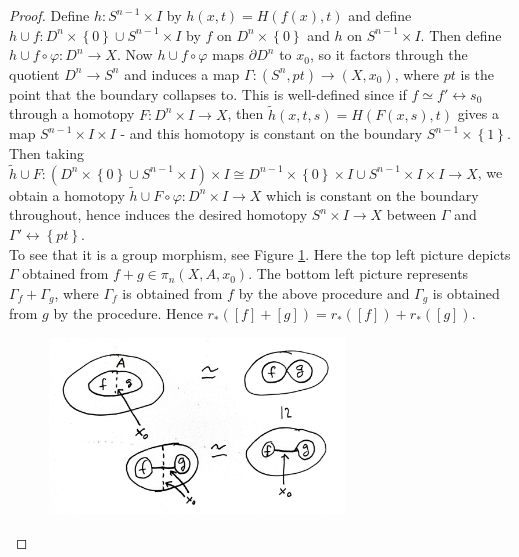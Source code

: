 \begin{proof}
        Define
        $h \colon S^{n-1} \times I$ by
        $h(x,t ) = H\left( f(x), t \right) $ and
        define $h \cup f \colon
        D^{n} \times \left\{ 0 \right\} \cup 
        S^{n-1} \times I$ by
        $f$ on $D^{n} \times \left\{ 0 \right\} $ and
        $h$ on $S^{n-1} \times I$. Then define
        $h \cup f \circ \varphi \colon
        D^{n} \to X$.
        Now $h \cup f \circ \varphi $ maps
        $\partial D^{n}$ to
        $x_0$, so
        it factors through the quotient
        $D^{n} \to S^{n}$ and induces
        a map
        $ \Gamma
        \colon \left( S^{n}, pt \right) 
        \to \left( X,x_0 \right) $, where
        $pt$ is the point that the boundary collapses to.
        This is well-defined since if
        $f \simeq f' \rel s_0$ through 
        a homotopy $F \colon D^{n} \times I \to X$, then
        $\tilde{h}(x,t,s) = 
        H\left( F(x,s), t \right) $ gives a map
        $S^{n-1} \times I \times I$ - and
        this homotopy is constant on the
        boundary $S^{n-1} \times \left\{ 1 \right\} $.
        Then taking
        $\tilde{h} \cup  F \colon
        \left( D^{n} \times \left\{ 0 \right\} 
        \cup S^{n-1} \times I\right)  \times I 
        \cong D^{n-1} \times \left\{ 0 \right\} \times I
        \cup S^{n-1} \times I \times I \to X$, we
        obtain a homotopy
        $\tilde{h}\cup F \circ \varphi \colon
        D^{n} \times I \to X$ which is constant on the
        boundary throughout, hence induces the desired
        homotopy $S^{n} \times I \to X$ between
        $\Gamma$ and $\Gamma' \rel \left\{ pt \right\} $.\\
        To see that it is a group morphism,
        see Figure \ref{fig:p32-jpeg}. Here
        the top left picture depicts
        $\Gamma$ obtained from
        $f + g \in 
        \pi_n \left( X, A, x_0 \right) $.
        The bottom left picture represents
        $\Gamma_f + \Gamma_g$, where
        $\Gamma_f$ is obtained from $f$ by the above procedure
        and $\Gamma_g$ is obtained from
        $g$ by the procedure. 
        Hence $r_* \left( \left[ f \right] +
        \left[ g \right] \right) 
        = r_* \left( \left[ f \right]  \right) 
        + r_* \left( \left[ g \right]  \right) $.

        \begin{figure}[htpb]
            \centering
            \includegraphics[width=0.7\textwidth]{Figures/p32.jpeg}
            \caption{}
            \label{fig:p32-jpeg}
        \end{figure}


\end{proof}
